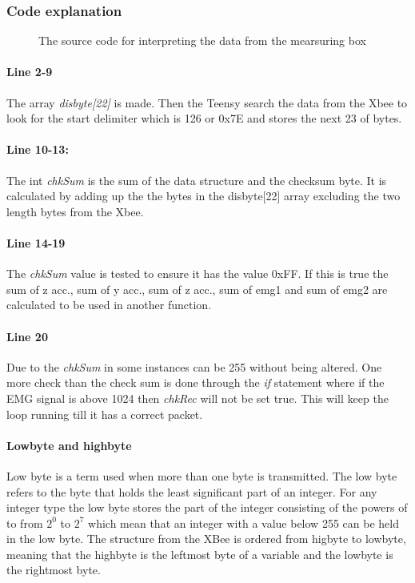 \subsubsection{Code explanation}
 \begin{figure}[H]
    \centering

    \caption{The source code for interpreting the data from the mearsuring box}
    \label{fig:EMG}
\end{figure}
 
\paragraph{Line 2-9}The array \textit{disbyte[22]} is made.
Then the Teensy search the data from the Xbee to look for the start delimiter which is 126 or 0x7E and stores the next 23 of bytes.
\paragraph{Line 10-13:}The int \textit{chkSum} is the sum of the data structure and the checksum byte. It is calculated by adding up the the bytes in the disbyte[22] array excluding the two length bytes from the Xbee.

\paragraph{Line 14-19}The \textit{chkSum} value is tested to ensure it has the value 0xFF. If this is true the sum of z acc., sum of y acc., sum of z acc., sum of emg1 and sum of emg2 are calculated to be used in another function.


\paragraph{Line 20} Due to the \textit{chkSum} in some instances can be 255 without being altered. One more check than the check sum is done through the \textit{if} statement where if the EMG signal is above 1024 then \textit{chkRec} will not be set true. This will keep the loop running till it has a correct packet.

\paragraph{Lowbyte and highbyte} Low byte is a term used when more than one byte is transmitted. The low byte refers to the byte that holds the least significant part of an integer. For any integer type the low byte stores the part of the integer consisting of the powers of to from $2^0$ to $2^7$ which mean that an integer with a value below 255 can be held in the low byte. The structure from the XBee is ordered from higbyte to lowbyte, meaning that the highbyte is the leftmost byte of a variable and the lowbyte is the rightmost byte. 

